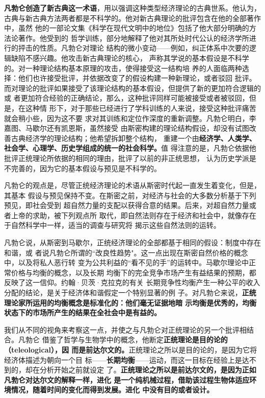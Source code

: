 \textbf{凡勃仑创造了新古典这一术语}，用以强调这种类型经济理论的古典世系。他认为，
古典与新古典方法两者都是不科学的。他对新古典理论的批评包含在他的全部著作中，虽然
他的一部论文集《科学在现代文明中的地位》包括了他大部分明确的方法论著作。他受到的
哲学训练，部分地解释了他对其所处时代公认的经济学所进行的抨击的性质。凡勃仑对理论
结构的微小变动——例如，纠正体系中次要的逻辑缺陷不感兴趣。他攻击新古典理论的核心，
声称其学说的基本假设是不科学的。对一种理论结构基本原理的攻击，使得接受这一结构培
养的人面临两种选择：他们也许接受批评，并依据改变了的假设构建一种新理论，或者驳回
批评。而对理论的批评如果接受了该理论结构的基本假设，但提供了新的更加符合逻辑的或
者更加符合经验的正确结论，那么，这种批评同样可能被接受或者被驳回，但是，在这种情
形下，对于那些已经进行了学科训练的人来说，接受这种批评痛苦就会稍小些，因为这不要
求对其训练和定位作深度的重新调整。凡勃仑明白，李嘉图、马歇尔还有凯恩斯，虽然接受
由斯密构建的理论结构假设，却没有试图改善古典经济学的理论结构；他希望拆卸整个结构，
重建一个由\textbf{经济学、人类学、社会学、心理学、历史学组成的统一的社会科学。}值
得注意的是，凡勃仑依据他批评正统理论所依据的相同的理由，批评了以前的非正统思想，
认为历史学派是不完善的，因为它的基本假设与预见是不科学的。

凡勃仑的观点是，尽管正统经济理论的术语从斯密时代起一直发生着变化，但是，其基本
假设与预见保持不变。在斯密之前，对经济与社会的大多数分析基于下列预见，即社会受到
超自然力量的支配以获得合意的结果。后来，对超自然力量或者上帝的求助，被下列观点所
取代，即自然法则存在于经济和社会中，就像存在于自然科学中一样，适当的调查与研究将
揭示这些自然法则的运转。

凡勃仑说，从斯密到马歇尔，正统经济理论的全部都基于相同的假设：制度中存在和谐，或
者说凡勃仑所谓的“改良性趋势"。这一点出现在斯密自然价格的概念中，以及将私人恶行转
变为公共利益的“看不见的手”的运转中。马歇尔理论中正常价格与均衡的概念，以及长期
均衡下的完全竞争市场产生有益结果的预期，都反映了这一信仰。约翰·贝茨·克拉克的有关
长期竞争性均衡产生一种公平的收入分配的结论，是关于经济体和谐假定一个特别显著的例
子。对凡勃仑来说，\textbf{正统理论家所运用的均衡概念是标准化的：他们毫无证据地暗
  示均衡是优秀的，均衡状态下的市场所产生的结果在全社会中是有益的。}

我们从不同的视角来考察这一点，并使之与凡勃仑对正统理论的另一个批评相结合。凡勃仑
借鉴了哲学与生物学中的概念，他断定\textbf{正统理论是目的论的（teleological），因
  而是前达尔文的。}正统理论之所以是目的论的，是因为它将经济体描述为朝向一个目
标——\textbf{长期均衡}——运动，而这一目标在经验上是达不到的，却在分析开始之前就设定
了。\textbf{正统理论之所以是前达尔文的，是因为正如凡勃仑对达尔文的解释一样，进化
  是一个纯机械过程，借助该过程生物体适应环境情况，随着时间的变化而得到发展。进化
  中没有目的或者设计。}


